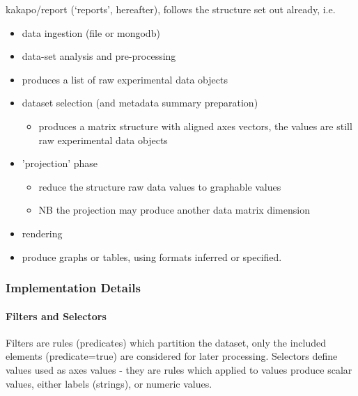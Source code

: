 kakapo/report (`reports', hereafter), follows the structure set out already, i.e.

\begin{itemize}
    \item data ingestion (file or mongodb)
    \item data-set analysis and pre-processing
    \item
    \begin{itemize}
     produces a list of raw experimental data objects
    \end{itemize}
    \item dataset selection (and metadata summary preparation)
     \begin{itemize}
     \item produces a matrix structure with aligned axes vectors, the values are still raw experimental data objects
    \end{itemize}
    \item 'projection' phase
    \begin{itemize}
     \item reduce the structure raw data values to graphable values
     \item NB the projection may produce another data matrix dimension
    \end{itemize}
    \item rendering
    \item \begin{itemize}
     produce graphs or tables, using formats inferred or specified.
\end{itemize}
\end{itemize}

\subsubsection{Implementation Details}
\paragraph{Filters and Selectors}
Filters are rules (predicates) which partition the dataset, only the included elements (predicate=true) are considered for later processing.
Selectors define values used as axes values - they are rules which applied to values produce scalar values, either labels (strings), or numeric values.

